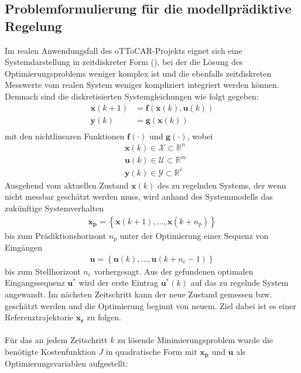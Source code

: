 \subsection{Problemformulierung für die modellprädiktive Regelung}
Im realen Anwendungsfall des oTToCAR-Projekts eignet sich eine Systemdarstellung in zeitdiskreter Form (\cite{ADA09}), bei der die Lösung des Optimierungsproblems weniger komplex ist und die ebenfalls zeitdiskreten Messwerte vom realen System weniger kompliziert integriert werden können. Demnach sind die diskretisierten Systemgleichungen wie folgt gegeben:
\begin{align*}
  \boldsymbol{x}(k+1)&=\boldsymbol{f}\left ( \boldsymbol{x}(k), \boldsymbol{u}(k) \right )\\
  \boldsymbol{y}(k)&=\boldsymbol{g}\left ( \boldsymbol{x}(k) \right )\\
\end{align*}
mit den nichtlinearen Funktionen $\boldsymbol{f}\left ( \cdot \right )$ und $\boldsymbol{g}\left ( \cdot \right )$, wobei
\begin{align*}
  &\boldsymbol{x}(k) \in \mathcal{X}\subset\mathbb{R}^n\\
  &\boldsymbol{u}(k) \in \mathcal{U}\subset\mathbb{R}^m\\
  &\boldsymbol{y}(k) \in \mathcal{Y}\subset\mathbb{R}^r
\end{align*}
Ausgehend vom aktuellen Zustand $\boldsymbol{x}(k)$ des zu regelnden Systems, der wenn nicht messbar geschätzt werden muss, wird anhand des Systemmodells das zukünftige Systemverhalten
\begin{align*}
  \boldsymbol{x_p}=\left\{ \boldsymbol{x}(k+1),\dots,\boldsymbol{x}(k+n_p)\right\}
\end{align*}
bis zum Prädiktionshorizont $n_p$ unter der Optimierung einer Sequenz von Eingängen
\begin{align*}
  \boldsymbol{u}=\left\{ \boldsymbol{u}(k),\dots,\boldsymbol{u}(k+n_c-1)\right\}
\end{align*}
bis zum Stellhorizont $n_c$ vorhergesagt. Aus der gefundenen optimalen Eingangssequenz $\boldsymbol{u}^*$ wird der erste Eintrag $\boldsymbol{u}^*(k)$ auf das zu regelnde System angewandt. Im nächsten Zeitschritt kann der neue Zustand gemessen bzw. geschätzt werden und die Optimierung beginnt von neuem. Ziel dabei ist es einer Referenztrajektorie $\boldsymbol{x_r}$ zu folgen.\\ \\
Für das an jedem Zeitschritt $k$ zu lösende Minimierungsproblem wurde die benötigte Kostenfunktion $J$ in quadratische Form mit $\boldsymbol{x_p}$ und $\boldsymbol{u}$ als Optimierungsvariablen aufgestellt:
